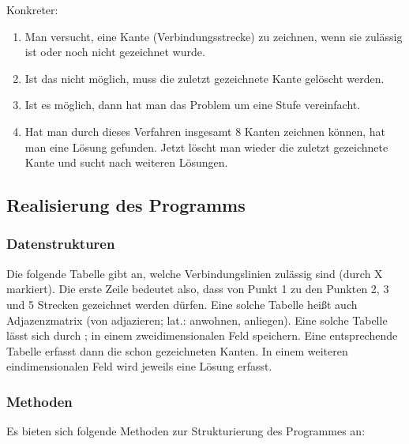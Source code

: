 \documentclass{lehramt-informatik-aufgabe}
\begin{document}
\noindent
Konkreter:

\begin{enumerate}
\item Man versucht, eine Kante (Verbindungsstrecke) zu zeichnen, wenn
sie zulässig ist oder noch nicht gezeichnet wurde.

\item Ist das nicht möglich, muss die zuletzt gezeichnete Kante gelöscht
werden.

\item  Ist es möglich, dann hat man das Problem um eine Stufe
vereinfacht.

\item  Hat man durch dieses Verfahren insgesamt 8 Kanten zeichnen
können, hat man eine Lösung gefunden. Jetzt löscht man wieder die
zuletzt gezeichnete Kante und sucht nach weiteren Lösungen.
\end{enumerate}

\subsection{Realisierung des Programms}

\subsubsection{Datenstrukturen}

Die folgende Tabelle gibt an, welche Verbindungslinien zulässig sind
(durch X markiert). Die erste Zeile bedeutet also, dass von Punkt 1 zu
den Punkten 2, 3 und 5 Strecken gezeichnet werden dürfen. Eine solche
Tabelle heißt auch Adjazenzmatrix (von adjazieren; lat.: anwohnen,
anliegen). Eine solche Tabelle lässt sich durch ; in einem zweidimensionalen Feld speichern. Eine
entsprechende Tabelle  erfasst dann die
schon gezeichneten Kanten. In einem weiteren eindimensionalen Feld
wird jeweils eine Lösung erfasst.

\subsubsection{Methoden}

Es bieten sich folgende Methoden zur Strukturierung des Programmes an:
\end{document}
